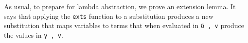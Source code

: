 \begin{fence}
\begin{code}%
\>[0]\AgdaSpace{}%
\AgdaSpace{}%
\<%
\\
\>[0]\AgdaSpace{}%
\AgdaSymbol{:}\AgdaSpace{}%
\AgdaSpace{}%
\AgdaSymbol{\}}\AgdaSpace{}%
\AgdaSpace{}%
\AgdaSpace{}%
\AgdaSpace{}%
\AgdaSpace{}%
\AgdaSpace{}%
\AgdaSpace{}%
\AgdaSpace{}%
\AgdaSpace{}%
\AgdaSpace{}%
\AgdaSpace{}%
\AgdaSpace{}%
\<%
\\
\>[0]\AgdaSpace{}%
\AgdaSymbol{\{}\AgdaSymbol{\}\{}\AgdaSymbol{\}}\AgdaSpace{}%
\AgdaSpace{}%
\AgdaSpace{}%
\AgdaSpace{}%
\AgdaSymbol{=}\AgdaSpace{}%
\AgdaSpace{}%
\AgdaSymbol{(}\AgdaSpace{}%
\AgdaSymbol{:}\AgdaSpace{}%
\AgdaSpace{}%
\AgdaSpace{}%
\AgdaSymbol{)}\AgdaSpace{}%
\AgdaSpace{}%
\AgdaSpace{}%
\AgdaSpace{}%
\AgdaSpace{}%
\AgdaSpace{}%
\AgdaSpace{}%
\AgdaSpace{}%
\AgdaSymbol{)}\<%
\end{code}
\end{fence}

As usual, to prepare for lambda abstraction, we prove an extension
lemma. It says that applying the \texttt{exts} function to a
substitution produces a new substitution that maps variables to terms
that when evaluated in \texttt{δ\ ,\ v} produce the values in
\texttt{γ\ ,\ v}.

